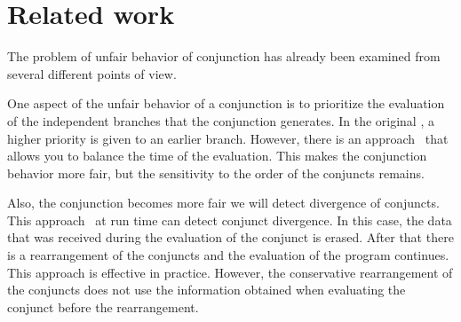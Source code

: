 \section{Related work}

The problem of unfair behavior of conjunction has already been examined from several different points of view.

One aspect of the unfair behavior of a conjunction is to prioritize the evaluation of the independent branches that the conjunction generates. In the original \mk, a higher priority is given to an earlier branch. However, there is an approach~\cite{fair:towardsAM} that allows you to balance the time of the evaluation. This makes the conjunction behavior more fair, but the sensitivity to the order of the conjuncts remains.

Also, the conjunction becomes more fair we will detect divergence of conjuncts. This approach~\cite{fair:DivTest} at run time can detect conjunct divergence. In this case, the data that was received during the evaluation of the conjunct is erased. After that there is a rearrangement of the conjuncts and the evaluation of the program continues. This approach is effective in practice. However, the conservative rearrangement of the conjuncts does not use the information obtained when evaluating the conjunct before the rearrangement.
